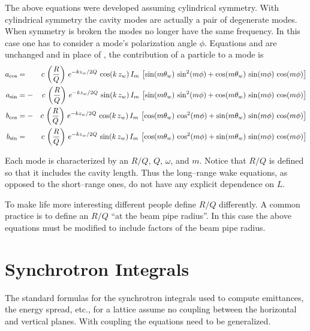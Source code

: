 The above equations were developed assuming cylindrical symmetry. With
cylindrical symmetry the cavity modes are actually a pair of
degenerate modes. When symmetry is broken the modes no longer have the
same frequency. In this case one has to consider a mode's polarization
angle $\phi$. Equations  and  are unchanged and
in place of , the contribution of a particle to a mode is
\begin{alignat}{2}
  a_{\cos} &=  &c \, \left( \frac{R}{Q} \right) \,
    e^{-k z_w/ 2 Q} \, \cos (k \, z_w) \, I_m \, \left[ 
    \sin(m \theta_w) \, \sin^2(m \phi) + 
    \cos(m \theta_w) \, \sin(m \phi) \, \cos(m\phi) \right]
    \nonumber \\
  a_{\sin} &= -&c \, \left( \frac{R}{Q} \right) \,
    e^{-k z_w/ 2 Q} \, \sin (k \, z_w) \, I_m \, \left[
    \sin(m \theta_w) \, \sin^2(m \phi) + 
    \cos(m \theta_w) \, \sin(m \phi) \, \cos(m\phi) \right]
    \\
  b_{\cos} &= -&c \, \left( \frac{R}{Q} \right) \,
    e^{-k z_w/ 2 Q} \, \cos (k \, z_w) \, I_m \, \left[
    \cos(m \theta_w) \, \cos^2(m \phi) + 
    \sin(m \theta_w) \, \sin(m \phi) \, \cos(m\phi) \right]
    \nonumber \\
  b_{\sin} &=  &c \, \left( \frac{R}{Q} \right) \,
    e^{-k z_w/ 2 Q} \, \sin (k \, z_w) \, I_m \, \left[
    \cos(m \theta_w) \, \cos^2(m \phi) + 
    \sin(m \theta_w) \, \sin(m \phi) \, \cos(m\phi) \right]
    \nonumber
\end{alignat}

Each mode is characterized by an $R/Q$, $Q$, $\omega$, and $m$. Notice
that $R/Q$ is defined so that it includes the cavity length. Thus the
long--range wake equations, as opposed to the short--range ones, do
not have any explicit dependence on $L$. 

To make life more interesting different people define $R/Q$
differently. A common practice is to define an $R/Q$ ``at the beam
pipe radius''. In this case the above equations must be modified to
include factors of the beam pipe radius.




\section{Synchrotron Integrals}
\label{s:synch_ints}

The standard formulas for the synchrotron integrals used to compute
emittances, the energy spread, etc., for a lattice assume no
coupling between the horizontal and vertical
planes\cite{b:helm,b:jowett}.  With coupling the equations need to be
generalized.

